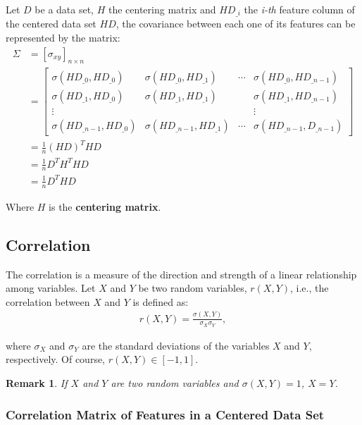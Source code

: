 \documentclass[12pt]{report}
\newtheorem{remark}{Remark}[section]
\begin{document}
Let $D$ be a data set, $H$ the centering matrix and $HD_{\_i}$ the {\em i-th} feature column of the centered data set $HD$, the covariance between each one of its features can be represented by the matrix:
\begin{align*}
\Sigma &= [\sigma_{xy}]_{n \times n} \\
&= \begin{bmatrix}
\sigma(HD_{\_0}, HD_{\_0}) & \sigma(HD_{\_0}, HD_{\_1}) & \cdots & \sigma(HD_{\_0}, HD_{\_n-1}) \\
\sigma(HD_{\_1}, HD_{\_0}) & \sigma(HD_{\_1}, HD_{\_1}) & & \sigma(HD_{\_1}, HD_{\_n-1}) \\
\vdots &&& \vdots \\
\sigma(HD_{\_n-1}, HD_{\_0}) & \sigma(HD_{\_n-1}, HD_{\_1}) & \cdots & \sigma(HD_{\_n-1}, D_{\_n-1})
\end{bmatrix} \\
&= \frac{1}{n} (HD)^T HD \\
&= \frac{1}{n} D^T H^T H D \\
 &= \frac{1}{n} D^T H D
\end{align*}

Where $H$ is the \textbf{centering matrix}.

\subsection{Correlation}

The correlation is a measure of the direction and strength of a linear relationship among variables. Let $X$ and $Y$ be two random variables, $r(X, Y)$, i.e., the correlation between $X$ and $Y$ is defined as: \cite{ross2010introductory}
\begin{align*}
	r(X, Y) = \frac{\sigma(X, Y)}{\sigma_X \sigma_Y},
\end{align*}

where $\sigma_X$ and $\sigma_Y$ are the standard deviations of the variables $X$ and $Y$, respectively. Of course, $r(X, Y) \in [-1, 1]$.

\begin{remark}
	If $X$ and $Y$ are two random variables and $\sigma(X, Y) = 1$, $X=Y$.
\end{remark}

\subsubsection{Correlation Matrix of Features in a Centered Data Set}
\end{document}
